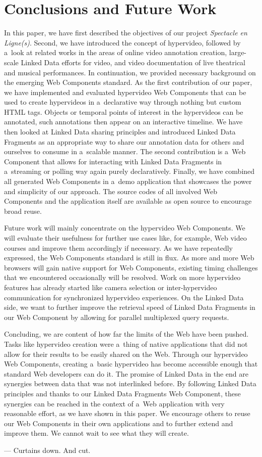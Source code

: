 \documentclass[runningheads,a4paper]{llncs}
\begin{document}
\section{Conclusions and Future Work}

In this paper, we have first described the objectives of our project \emph{Spectacle en Ligne(s)}.
Second, we have introduced the concept of hypervideo, followed by a~look at related works
in the areas of online video annotation creation, large-scale Linked Data efforts for video,
and video documentation of live theatrical and musical performances.
In continuation, we provided necessary background on the emerging Web Components standard.
As the first contribution of our paper, we have implemented and evaluated hypervideo Web Components
that can be used to create hypervideos in a~declarative way through nothing but custom HTML tags.
Objects or temporal points of interest in the hypervideos can be annotated,
such annotations then appear on an interactive timeline.
We have then looked at Linked Data sharing principles and introduced Linked Data Fragments
as an appropriate way to share our annotation data for others
and ourselves to consume in a~scalable manner.
The second contribution is a~Web Component that allows for interacting with Linked Data Fragments
in a~streaming or polling way again purely declaratively.
Finally, we have combined all generated Web Components in a~demo application
that showcases the power and simplicity of our approach.
The source codes of all involved Web Components and the application itself
are available as open source to encourage broad reuse.

Future work will mainly concentrate on the hypervideo Web Components.
We will evaluate their usefulness for further use cases like,
for example, Web video courses and improve them accordingly if necessary.
As we have repeatedly expressed, the Web Components standard is still in flux.
As more and more Web browsers will gain native support for Web Components,
existing timing challenges that we encountered occasionally will be resolved.
Work on more hypervideo features has already started like camera selection
or inter-hypervideo communication for synchronized hypervideo experiences.
On the Linked Data side, we want to further improve the retrieval speed
of Linked Data Fragments in our Web Component by allowing for parallel multiplexed query requests.

Concluding, we are content of how far the limits of the Web have been pushed.
Tasks like hypervideo creation were a~thing of native applications
that did not allow for their results to be easily shared on the Web.
Through our hypervideo Web Components, creating a~basic hypervideo
has become accessible enough that standard Web developers can do it.
The promise of Linked Data in the end are synergies between data that was not interlinked before.
By following Linked Data principles and thanks to our Linked Data Fragments Web Component,
these synergies can be reached in the context of a~Web application with very reasonable effort,
as we have shown in this paper.
We encourage others to reuse our Web Components in their own applications
and to further extend and improve them.
We cannot wait to see what they will create.

\begin{center}
  ---
  Curtains down. And cut.	
\end{center}





\end{document}
